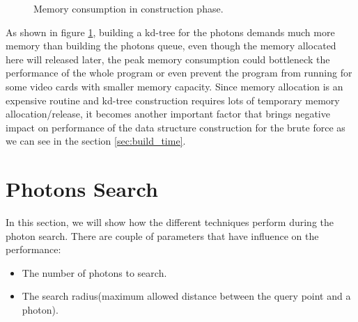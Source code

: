 \begin{figure}[ftp]
    \centering
    \renewcommand{\thefigure}{\thechapter.\arabic{figure}}
    \caption[Memory consumption in construction phase]{Memory consumption in construction phase. }
    \label{fig:memory_consumption_2}
\end{figure}

As shown in figure \ref{fig:memory_consumption_2}, building a kd-tree for the photons demands much more memory than building the photons queue, even though the memory allocated here will released later, the peak memory consumption could bottleneck the performance of the whole program or even prevent the program from running for some video cards with smaller memory capacity. Since memory allocation is an expensive routine and kd-tree construction requires lots of temporary memory allocation/release, it becomes another important factor that brings negative impact on performance of the data structure construction for the brute force as we can see in the section \ref{sec:build_time}.

\section{Photons Search}

In this section, we will show how the different techniques perform during the photon search. There are couple of parameters that have influence on the performance:

\begin{itemize}

\item{The number of photons to search. }

\item{The search radius(maximum allowed distance between the query point and a photon). }

\end{itemize}

